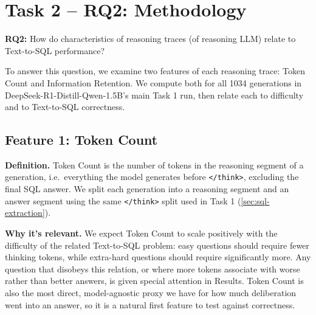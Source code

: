 %
%

\section{Task 2 -- RQ2: Methodology}
\label{sec:rq2-methodology}

\textbf{RQ2:} How do characteristics of reasoning traces (of reasoning LLM) relate to Text-to-SQL performance?

To answer this question, we examine two features of each reasoning trace: Token Count and Information Retention. We compute both for all 1034 generations in DeepSeek-R1-Distill-Qwen-1.5B's main Task 1 run, then relate each to difficulty and to Text-to-SQL correctness.

\subsection{Feature 1: Token Count}
\label{sec:rq2-feature-tokencount}

\textbf{Definition.} Token Count is the number of tokens in the reasoning segment of a generation, i.e.\ everything the model generates before \texttt{</think>}, excluding the final SQL answer. We split each generation into a reasoning segment and an answer segment using the same \texttt{</think>} split used in Task 1 (\ref{sec:sql-extraction}).

\textbf{Why it's relevant.} We expect Token Count to scale positively with the difficulty of the related Text-to-SQL problem: easy questions should require fewer thinking tokens, while extra-hard questions should require significantly more. Any question that disobeys this relation, or where more tokens associate with worse rather than better answers, is given special attention in Results. Token Count is also the most direct, model-agnostic proxy we have for how much deliberation went into an answer, so it is a natural first feature to test against correctness.

